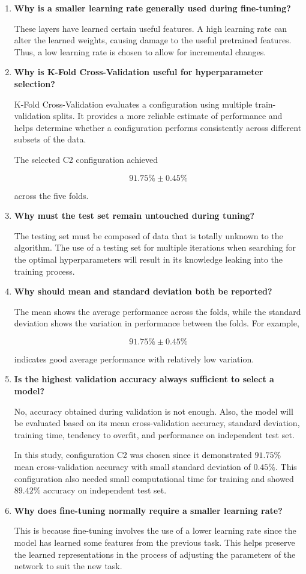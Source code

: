 \documentclass[10pt]{article}
\begin{document}
\begin{enumerate}
\item \textbf{Why is a smaller learning rate generally used during fine-tuning?}

These layers have learned certain useful features. A high learning rate can alter the learned weights, causing damage to the useful pretrained features. Thus, a low learning rate is chosen to allow for incremental changes.

\item \textbf{Why is K-Fold Cross-Validation useful for hyperparameter selection?}

K-Fold Cross-Validation evaluates a configuration using multiple train-validation splits. It provides a more reliable estimate of performance and helps determine whether a configuration performs consistently across different subsets of the data.

The selected C2 configuration achieved

\[
91.75\%\pm0.45\%
\]

across the five folds.

\item \textbf{Why must the test set remain untouched during tuning?}

The testing set must be composed of data that is totally unknown to the algorithm. The use of a testing set for multiple iterations when searching for the optimal hyperparameters will result in its knowledge leaking into the training process.

\item \textbf{Why should mean and standard deviation both be reported?}

The mean shows the average performance across the folds, while the standard deviation shows the variation in performance between the folds. For example,

\[
91.75\%\pm0.45\%
\]

indicates good average performance with relatively low variation.

\item \textbf{Is the highest validation accuracy always sufficient to select a model?}

No, accuracy obtained during validation is not enough. Also, the model will be evaluated based on its mean cross-validation accuracy, standard deviation, training time, tendency to overfit, and performance on independent test set.

In this study, configuration C2 was chosen since it demonstrated $91.75\%$ mean cross-validation accuracy with small standard deviation of $0.45\%$. This configuration also needed small computational time for training and showed $89.42\%$ accuracy on independent test set.

\item \textbf{Why does fine-tuning normally require a smaller learning rate?}

This is because fine-tuning involves the use of a lower learning rate since the model has learned some features from the previous task. This helps preserve the learned representations in the process of adjusting the parameters of the network to suit the new task.

\end{enumerate}
\end{document}
